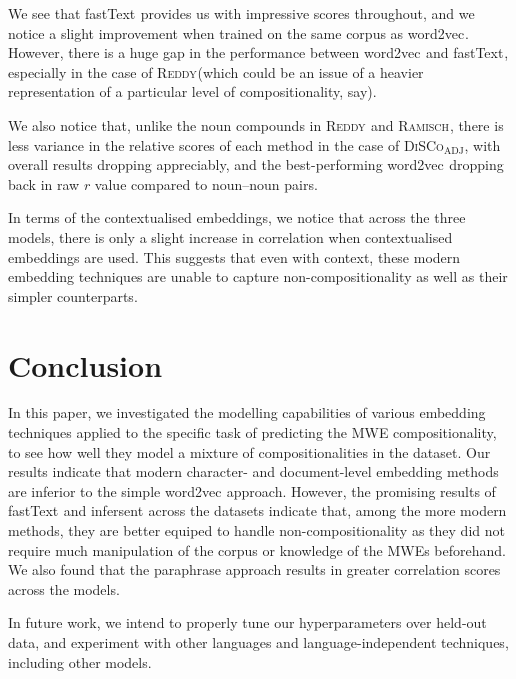 \documentclass[11pt,a4paper]{article}
\newcommand{\embmethod}[2][]{\textsf{#2}$_{\text{#1}}$\xspace}
\newcommand{\wordtovec}{\embmethod{word2vec}}
\newcommand{\infersent}[1][]{\embmethod[#1]{infersent}}
\newcommand{\fasttext}{\embmethod{fastText}}
\newcommand{\dataset}[2][]{\textsc{#2}$_{\text{#1}}$\xspace}
\newcommand{\reddy}{\dataset{Reddy}}
\newcommand{\ramisch}{\dataset{Ramisch}}
\newcommand{\discoj}[1][]{\dataset[#1]{DiSCo}}
\begin{document}
We see that \fasttext provides us with impressive scores throughout, and we notice a slight improvement when trained on the same corpus as \wordtovec. However, there is a huge gap in the performance between \wordtovec and \fasttext, especially in the case of \reddy (which could be an issue of a heavier representation of a particular level of compositionality, say).

We also notice that, unlike the noun compounds in \reddy and \ramisch, there is less variance in the relative scores of each method in the case of \discoj[ADJ], with overall results dropping appreciably, and the best-performing \wordtovec dropping back in raw $r$ value compared to noun--noun pairs.

In terms of the contextualised embeddings, we notice that across the three models, there is only a slight increase in correlation when contextualised embeddings are used. This suggests that even with context, these modern embedding techniques are unable to capture non-compositionality as well as their simpler counterparts. 

\section{Conclusion}
\label{sec:length}

In this paper, we investigated the modelling capabilities of various embedding techniques applied to the specific task of predicting the MWE compositionality, to see how well they model a mixture of compositionalities in the dataset. Our results indicate that modern character- and document-level embedding methods are inferior to the simple \wordtovec approach. However, the promising results of \fasttext and \infersent across the datasets indicate that, among the more modern methods, they are better equiped to handle non-compositionality as they did not require much manipulation of the corpus or knowledge of the MWEs beforehand. We also found that the paraphrase approach results in greater correlation scores across the models.

In future work, we intend to properly tune our hyperparameters over held-out data, and experiment with other languages and language-independent techniques, including other models.

\end{document}
